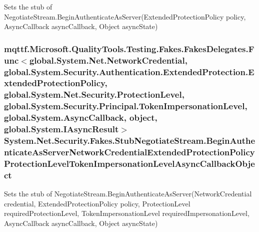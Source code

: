 Sets the stub of Negotiate\-Stream.\-Begin\-Authenticate\-As\-Server(\-Extended\-Protection\-Policy policy, Async\-Callback async\-Callback, Object async\-State)

\hypertarget{class_system_1_1_net_1_1_security_1_1_fakes_1_1_stub_negotiate_stream_a16cbbc7c52865270c42fb7f80c6537ae}{
\subsubsection[{Begin\-Authenticate\-As\-Server\-Network\-Credential\-Extended\-Protection\-Policy\-Protection\-Level\-Token\-Impersonation\-Level\-Async\-Callback\-Object}]{\setlength{\rightskip}{0pt plus 5cm}mqttf.\-Microsoft.\-Quality\-Tools.\-Testing.\-Fakes.\-Fakes\-Delegates.\-Func$<$global.\-System.\-Net.\-Network\-Credential, global.\-System.\-Security.\-Authentication.\-Extended\-Protection.\-Extended\-Protection\-Policy, global.\-System.\-Net.\-Security.\-Protection\-Level, global.\-System.\-Security.\-Principal.\-Token\-Impersonation\-Level, global.\-System.\-Async\-Callback, object, global.\-System.\-I\-Async\-Result$>$ System.\-Net.\-Security.\-Fakes.\-Stub\-Negotiate\-Stream.\-Begin\-Authenticate\-As\-Server\-Network\-Credential\-Extended\-Protection\-Policy\-Protection\-Level\-Token\-Impersonation\-Level\-Async\-Callback\-Object}}\label{class_system_1_1_net_1_1_security_1_1_fakes_1_1_stub_negotiate_stream_a16cbbc7c52865270c42fb7f80c6537ae}


Sets the stub of Negotiate\-Stream.\-Begin\-Authenticate\-As\-Server(\-Network\-Credential credential, Extended\-Protection\-Policy policy, Protection\-Level required\-Protection\-Level, Token\-Impersonation\-Level required\-Impersonation\-Level, Async\-Callback async\-Callback, Object async\-State)

